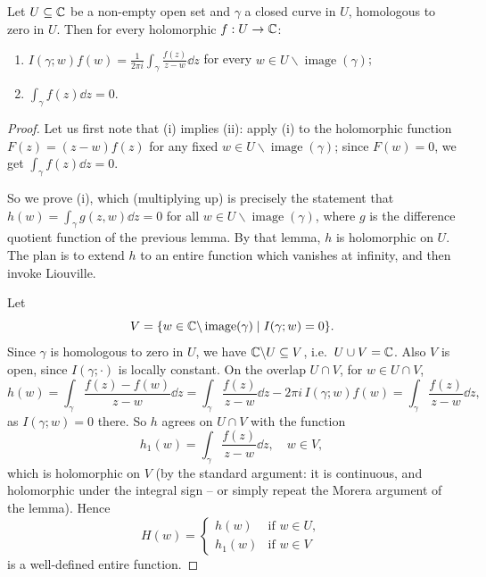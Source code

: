 \documentclass[a4paper]{scrartcl}
\begin{document}
\begin{theorem}
    Let $U \subseteq \mathbb{C}$ be a non-empty open set and $\gamma$ a closed curve in $U$, homologous to zero in $U$. Then for every holomorphic $f: U \rightarrow \mathbb{C}$:
    \begin{enumerate}[label=(\roman*)]
        \item $\displaystyle I(\gamma; w)f(w) = \frac{1}{2 \pi i} \int_\gamma \frac{f(z)}{z - w} \dd z$ for every $w \in U \backslash \operatorname{image}(\gamma)$;
        \item $\displaystyle\int_\gamma f(z) \dd z = 0$.
    \end{enumerate}
\end{theorem}
\begin{proof}
    Let us first note that (i) implies (ii): apply (i) to the holomorphic function $F(z) = (z - w)f(z)$ for any fixed $w \in U \backslash \operatorname{image}(\gamma)$; since $F(w) = 0$, we get $\int_\gamma f(z) \dd z = 0$.

    So we prove (i), which (multiplying up) is precisely the statement that $h(w) = \int_\gamma g(z, w) \dd z = 0$ for all $w \in U \backslash \operatorname{image}(\gamma)$, where $g$ is the difference quotient function of the previous lemma. By that lemma, $h$ is holomorphic on $U$. The plan is to extend $h$ to an entire function which vanishes at infinity, and then invoke Liouville.

    Let
    $$
    V = \{w \in \mathbb{C} \backslash \operatorname{image}(\gamma) \mid I(\gamma; w) = 0\}.
    $$
    Since $\gamma$ is homologous to zero in $U$, we have $\mathbb{C} \backslash U \subseteq V$, i.e.\ $U \cup V = \mathbb{C}$. Also $V$ is open, since $I(\gamma; \cdot)$ is locally constant. On the overlap $U \cap V$, for $w \in U \cap V$,
    $$
    h(w) = \int_\gamma \frac{f(z) - f(w)}{z - w} \dd z = \int_\gamma \frac{f(z)}{z - w} \dd z - 2 \pi i \, I(\gamma; w) f(w) = \int_\gamma \frac{f(z)}{z - w} \dd z,
    $$
    as $I(\gamma; w) = 0$ there. So $h$ agrees on $U \cap V$ with the function
    $$
    h_1(w) = \int_\gamma \frac{f(z)}{z - w} \dd z, \quad w \in V,
    $$
    which is holomorphic on $V$ (by the standard argument: it is continuous, and holomorphic under the integral sign -- or simply repeat the Morera argument of the lemma). Hence
    $$
    H(w) = \begin{cases}
        h(w) &\mbox{if } w \in U, \\
        h_1(w) &\mbox{if } w \in V
       \end{cases}
    $$
    is a well-defined entire function.


\end{proof}
\end{document}
